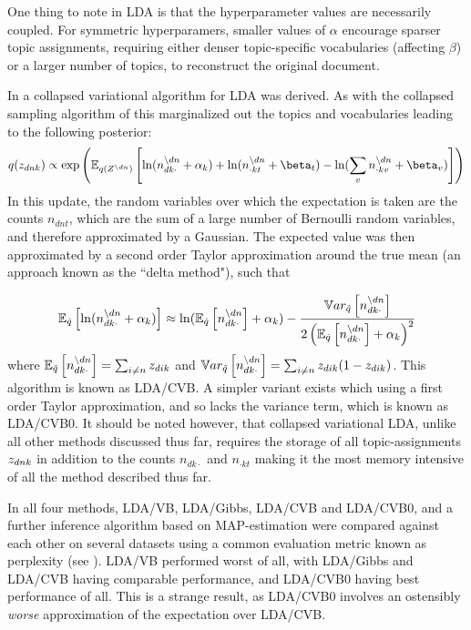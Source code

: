 One thing to note in LDA is that the hyperparameter values are necessarily coupled. For symmetric hyperparamers, smaller values of $\alpha$ encourage sparser topic assignments, requiring either denser topic-specific vocabularies (affecting $\beta$) or a larger number of topics, to reconstruct the original document.

In \cite{Teh2007} a collapsed variational algorithm for LDA was derived. As with the collapsed sampling algorithm of \cite{Griffiths2004} this marginalized out the topics and vocabularies leading to the following posterior:
\begin{equation}
q(\zdnk) \propto \exp\left(\ex{
    \ln (n_{dk\cdot}^{\setminus dn} + \alpha_k ) 
    + \ln (n_{\cdot kt}^{\setminus dn} + \beta_t)
    - \ln (\sum_v n_{\cdot kv}^{\setminus dn} + \beta_v)}{q(Z^{\setminus dn})}
\right)
\end{equation}
In this update, the random variables over which the expectation is taken are the counts $n_{dnt}$, which are the sum of a large number of Bernoulli random variables, and therefore approximated by a Gaussian. The expected value was then approximated by a second order Taylor approximation around the true mean (an approach known as the ``delta method"\cite{Wang2013}), such that

\begin{align}
\ex{\ln (n_{dk\cdot}^{\setminus dn} + \alpha_k )}{\hat{q}} 
\approx 
\ln (\ex{n_{dk\cdot}^{\setminus dn}}{\hat{q}} + \alpha_k ) - \frac{\var{n_{dk\cdot}^{\setminus dn}}{\hat{q}}}{2\left( \ex{n_{dk\cdot}^{\setminus dn}}{\hat{q}} + \alpha_k \right)^2}
\end{align}
where $\ex{n_{dk\cdot}^{\setminus dn}}{\hat{q}} = \sum_{i \neq n} z_{dik}$ and $\var{n_{dk\cdot}^{\setminus dn}}{\hat{q}} = \sum_{i \neq n} z_{dik}(1 - z_{dik})$. This algorithm is known as LDA/CVB. A simpler variant exists which using a first order Taylor approximation, and so lacks the variance term, which is known as LDA/CVB0. It should be noted however, that collapsed variational LDA, unlike all other methods discussed thus far, requires the storage of all topic-assignments $\zdnk$ in addition to the counts $n_{dk\cdot}$ and $n_{\cdot kt}$ making it the most memory intensive of all the method described thus far.

In \cite{Asuncion2012} all four methods, LDA/VB, LDA/Gibbs, LDA/CVB and LDA/CVB0, and a further inference algorithm based on MAP-estimation were compared against each other on several datasets using a common evaluation metric known as perplexity (see ). LDA/VB performed worst of all, with LDA/Gibbs and LDA/CVB having comparable performance, and LDA/CVB0 having best performance of all. This is a strange result, as LDA/CVB0 involves an ostensibly \emph{worse} approximation of the expectation over LDA/CVB. 

